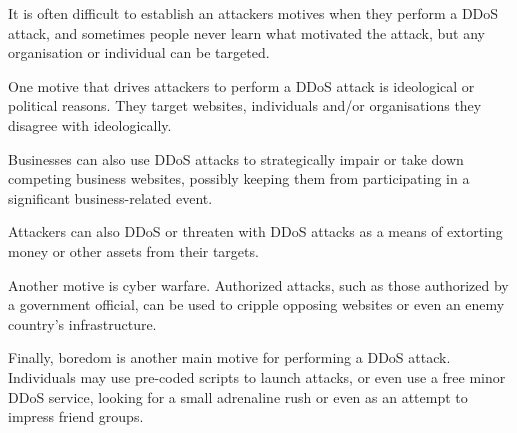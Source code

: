 \raggedright

It is often difficult to establish an attackers motives when they perform a DDoS attack, and sometimes people never learn what motivated the attack, but any organisation or individual can be targeted.

\vspace{0.5cm}

One motive that drives attackers to perform a DDoS attack is ideological or political reasons. They target websites, individuals and/or organisations they disagree with ideologically.

Businesses can also use DDoS attacks to strategically impair or take down competing business websites, possibly keeping them from participating in a significant business-related event.

Attackers can also DDoS or threaten with DDoS attacks as a means of extorting money or other assets from their targets.

Another motive is cyber warfare. Authorized attacks, such as those authorized by a government official, can be used to cripple opposing websites or even an enemy country's infrastructure.

Finally, boredom is another main motive for performing a DDoS attack. Individuals may use pre-coded scripts to launch attacks, or even use a free minor DDoS service, looking for a small adrenaline rush or even as an attempt to impress friend groups.